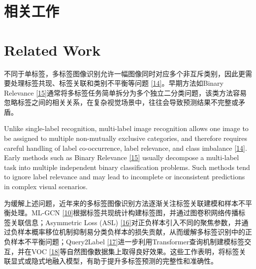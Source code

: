 \section{相关工作}\label{ux76f8ux5173ux5de5ux4f5c}

\section*{Related Work}

\label{a.ux591aux6807ux7b7eux56feux50cfux8bc6ux522b}


不同于单标签，多标签图像识别允许一幅图像同时对应多个非互斥类别，因此更需要处理标签共现、标签关联和类别不平衡等问题 \hyperref[_Ref213949872]{{[}14{]}}。早期方法如Binary Relevance \hyperref[_Ref213949896]{{[}15{]}}通常将多标签任务简单拆分为多个独立二分类问题，该类方法容易忽略标签之间的相关关系，在复杂视觉场景中，往往会导致预测结果不完整或矛盾。

Unlike single-label recognition, multi-label image recognition allows one image to be assigned to multiple non-mutually exclusive categories, and therefore requires careful handling of label co-occurrence, label relevance, and class imbalance \hyperref[_Ref213949872]{{[}14{]}}. Early methods such as Binary Relevance \hyperref[_Ref213949896]{{[}15{]}} usually decompose a multi-label task into multiple independent binary classification problems. Such methods tend to ignore label relevance and may lead to incomplete or inconsistent predictions in complex visual scenarios.

为缓解上述问题，近年来的多标签图像识别方法逐渐关注标签关联建模和样本不平衡处理。ML-GCN \hyperref[_Ref213949382]{{[}10{]}}根据标签共现统计构建标签图，并通过图卷积网络传播标签关联信息；Asymmetric Loss (ASL) \hyperref[_Ref213949927]{{[}16{]}}对正负样本引入不同的聚焦参数，并通过负样本概率移位机制抑制易分类负样本的损失贡献，从而缓解多标签识别中的正负样本不平衡问题；Query2Label \hyperref[_Ref213950246]{{[}17{]}}进一步利用Transformer查询机制建模标签交互，并在VOC \hyperref[_Ref213950282]{{[}18{]}}等自然图像数据集上取得良好效果。这些工作表明，将标签关联显式或隐式地融入模型，有助于提升多标签预测的完整性和准确性。

